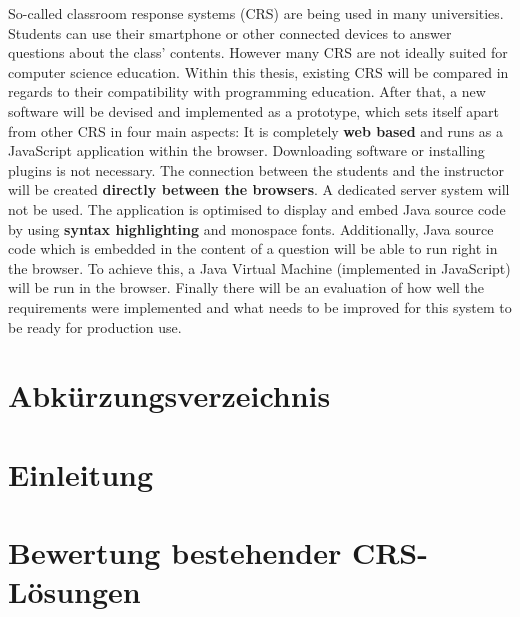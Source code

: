 \documentclass[draft=false
              ,paper=a4
              ,twoside=false
              ,fontsize=11pt
              ,headsepline
              ,BCOR=10mm
              ]{scrbook}
\begin{document}
{So-called classroom response systems (CRS) are being used in many universities. Students can use their smartphone or other connected devices to answer questions about the class' contents. However many CRS are not ideally suited for computer science education. Within this thesis, existing CRS will be compared in regards to their compatibility with programming education. After that, a new software will be devised and implemented as a prototype, which sets itself apart from other CRS in four main aspects:\newline
It is completely \textbf{web based} and runs as a JavaScript application within the browser. Downloading software or installing plugins is not necessary.\newline
The connection between the students and the instructor will be created \textbf{directly between the browsers}. A dedicated server system will not be used.\newline
The application is optimised to display and embed Java source code by using \textbf{syntax highlighting} and monospace fonts.\newline
Additionally, Java source code which is embedded in the content of a question will be able to run right in the browser. To achieve this, a Java Virtual Machine (implemented in JavaScript) will be run in the browser.\newline
Finally there will be an evaluation of how well the requirements were implemented and what needs to be improved for this system to be ready for production use.}
\newpage
\singlespacing

\setcounter{tocdepth}{3}
\tableofcontents
\newpage
\listoffigures
\newpage
\lstlistoflistings
\newpage
\chapter*{Abkürzungsverzeichnis}


\mainmatter
\onehalfspacing

\chapter{Einleitung}

\label{chap:einleitung}
%
\chapter{Bewertung bestehender CRS-Lösungen}
\label{chap:bewertung}

%
\end{document}
